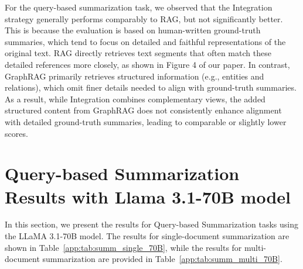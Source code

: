 For the query-based summarization task, we observed that the Integration strategy generally performs comparably to RAG, but not significantly better. This is because the evaluation is based on human-written ground-truth summaries, which tend to focus on detailed and faithful representations of the original text. RAG directly retrieves text segments that often match these detailed references more closely, as shown in Figure 4 of our paper. In contrast, GraphRAG primarily retrieves structured information (e.g., entities and relations), which omit finer details needed to align with ground-truth summaries. As a result, while Integration combines complementary views, the added structured content from GraphRAG does not consistently enhance alignment with detailed ground-truth summaries, leading to comparable or slightly lower scores.

\begin{table}[!htb]
\centering
\caption{Performance of integrating RAG and GraphRAG with Llama 3.1–70B on the NovelQA dataset.}
\label{app:tab:inte5}
\end{table}

\section{Query-based Summarization Results with Llama 3.1-70B model}
\label{app:summ_result}
In this section, we present the results for Query-based Summarization tasks using the LLaMA 3.1-70B model. The results for single-document summarization are shown in Table~\ref{app:tab:summ_single_70B}, while the results for multi-document summarization are provided in Table~\ref{app:tab:summ_multi_70B}.

